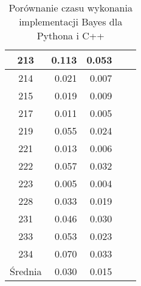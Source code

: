 \begin{table}
\begin{tabular}{|c|r|r|r|r|}
		\hline
		213 & 0.113      & 0.053      \\
		\hline
		214 & 0.021      & 0.007      \\
		\hline
		215 & 0.019      & 0.009      \\
		\hline
		217 & 0.011      & 0.005      \\
		\hline
		219 & 0.055      & 0.024      \\
		\hline
		221 & 0.013      & 0.006      \\
		\hline
		222 & 0.057      & 0.032      \\
		\hline
		223 & 0.005      & 0.004      \\
		\hline
		228 & 0.033      & 0.019      \\
		\hline
		231 & 0.046      & 0.030      \\
		\hline
		233 & 0.053      & 0.023      \\
		\hline
		234 & 0.070      & 0.033      \\
		\hline
		Średnia & 0.030      & 0.015      \\
        \hline
	\end{tabular}
	\caption{Porównanie czasu wykonania implementacji Bayes dla Pythona i C++}
	\label{tab:czasy}	
\end{table}

